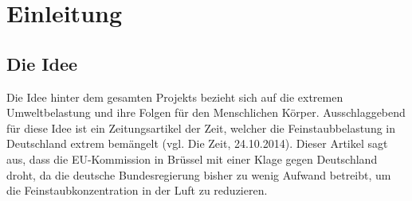 \section{Einleitung}
\subsection{Die Idee}

Die Idee hinter dem gesamten Projekts bezieht sich auf die extremen Umweltbelastung und ihre Folgen für den Menschlichen Körper. Ausschlaggebend für diese Idee ist ein Zeitungsartikel der Zeit, welcher die Feinstaubbelastung in Deutschland extrem bemängelt (vgl. Die Zeit, 24.10.2014). Dieser Artikel sagt aus, dass die EU-Kommission in Brüssel mit einer Klage gegen Deutschland droht, da die deutsche Bundesregierung bisher zu wenig Aufwand betreibt, um die Feinstaubkonzentration in der Luft zu reduzieren.